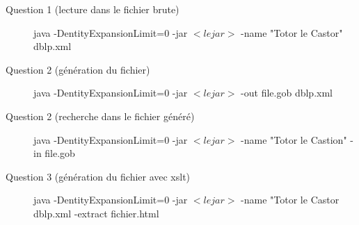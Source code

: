 \documentclass[french, 12pt]{report}
\begin{document}
\begin{description}
\item[Question 1 (lecture dans le fichier brute)] java -DentityExpansionLimit=0 -jar $<le jar>$ -name "Totor le Castor" dblp.xml
\item[Question 2 (génération du fichier)] java -DentityExpansionLimit=0 -jar $<le jar>$ -out file.gob dblp.xml
\item[Question 2 (recherche dans le fichier généré)] java -DentityExpansionLimit=0 -jar $<le jar>$ -name "Totor le Castion" -in file.gob
\item[Question 3 (génération du fichier avec xslt)] java -DentityExpansionLimit=0 -jar $<le jar>$ -name "Totor le Castor dblp.xml -extract fichier.html
\end{description}
\end{document}

